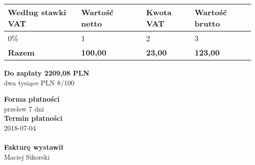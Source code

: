 \documentclass[a4paper,10pt]{article}
\begin{document}
    \begin{table}[H]
    \raggedleft
    \begin{tabular}{| p{} | p{} | p{} | p{} | p{} |}
    \hline
    \textbf{Według stawki VAT} & \textbf{Wartość netto} & \cellcolor[gray]{0.9} & \textbf{Kwota VAT} & \textbf{Wartość brutto} \\ \hline
  
    {0}\% & {1} & \cellcolor[gray]{0.9} & {2} & {3} \\ \hline
  
  \hline
  {\textbf{Razem}}  & \textbf{100,00} & \cellcolor[gray]{0.9} & \textbf{23,00} & \textbf{123,00} \\ \hline
  \end{tabular}
  \end{table}

  \noindent
  \begin{flushright}
  \textbf{\LARGE{Do zapłaty} 2209,08 PLN}\\
  dwa tysiące PLN 8/100
  \end{flushright}

  \vfill
  \noindent
  \textbf{Forma płatności}\\
  przelew 7 dni\\
  \textbf{Termin płatności}\\
  2018-07-04\\
  \\
  
  \noindent
    \textbf{Fakturę wystawił}\\
    Maciej Sikorski
    
\end{document}
